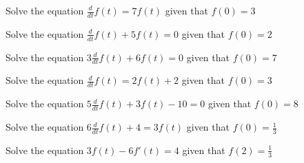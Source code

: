 

\begin{enumerate}

\qitem Solve the equation $\frac{d}{dt} f(t) = 7 f(t) $ given that $f(0) = 3$


\qitem Solve the equation $\frac{d}{dt} f(t) + 5 f(t) = 0 $ given that $f(0) = 2$


\qitem Solve the equation $3 \frac{d}{dt} f(t) + 6 f(t) = 0$ given that $f(0) = 7$


\qitem Solve the equation $\frac{d}{dt} f(t) = 2f(t) + 2 $ given that $f(0) = 3$



\qitem Solve the equation $5\frac{d}{dt} f(t) + 3f(t) - 10 = 0 $ given that $f(0) = 8$




\qitem Solve the equation $6\frac{d}{dt} f(t) + 4 = 3f(t) $ given that $f(0) = \frac{1}{3}$



\qitem Solve the equation $3f(t) - 6 f'(t) = 4$ given that $f(2) = \frac{1}{3}$


\end{enumerate}
